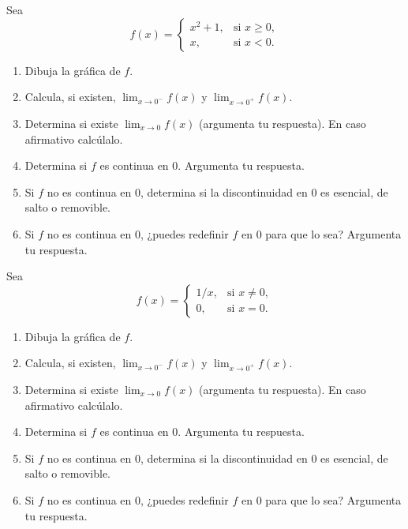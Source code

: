 \documentclass[12pt,a4paper]{book}
\begin{document}
    \begin{ejercicio}\label{ej:218}
        Sea
        \begin{equation*}
            f(x)=\begin{cases}
                x^{2}+1, & \text{si }x\geq 0,\\
                x, & \text{si }x<0.
            \end{cases}
        \end{equation*}
        \begin{enumerate}[nosep]
            \item Dibuja la gráfica de $f$.
            \item Calcula, si existen, $\lim_{x\to 0^{-}}f(x)$ y $\lim_{x\to 0^{+}}f(x)$.
            \item Determina si existe $\lim_{x\to 0}f(x)$ (argumenta tu respuesta). En caso afirmativo
            calcúlalo.
            \item Determina si $f$ es continua en $0$. Argumenta tu respuesta.
            \item Si $f$ no es continua en $0$, determina si la discontinuidad en $0$ es esencial,
            de salto o removible.
            \item Si $f$ no es continua en $0$, ¿puedes redefinir $f$ en $0$ para que lo sea? Argumenta
            tu respuesta.
        \end{enumerate}
    \end{ejercicio}

    \begin{ejercicio}\label{ej:219}
        Sea
        \begin{equation*}
            f(x)=\begin{cases}
                1/x, & \text{si }x\neq 0,\\
                0, & \text{si }x=0.
            \end{cases}
        \end{equation*}
        \begin{enumerate}[nosep]
            \item Dibuja la gráfica de $f$.
            \item Calcula, si existen, $\lim_{x\to 0^{-}}f(x)$ y $\lim_{x\to 0^{+}}f(x)$.
            \item Determina si existe $\lim_{x\to 0}f(x)$ (argumenta tu respuesta). En caso afirmativo
            calcúlalo.
            \item Determina si $f$ es continua en $0$. Argumenta tu respuesta.
            \item Si $f$ no es continua en $0$, determina si la discontinuidad en $0$ es esencial,
            de salto o removible.
            \item Si $f$ no es continua en $0$, ¿puedes redefinir $f$ en $0$ para que lo sea? Argumenta
            tu respuesta.
        \end{enumerate}
    \end{ejercicio}
\end{document}
